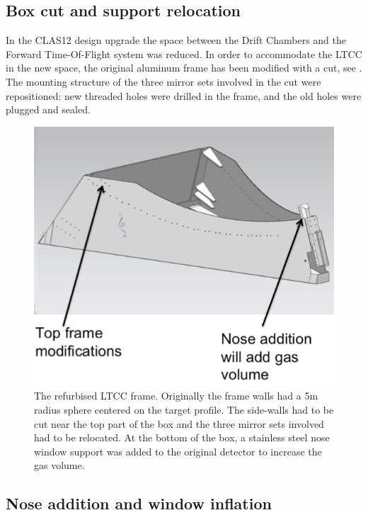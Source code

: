 \subsection{Box cut and support relocation }

In the CLAS12 design upgrade the space between the Drift Chambers and the Forward Time-Of-Flight system was reduced.
In order to accommodate the LTCC in the new space, the original aluminum frame has been modified with a cut, see . The mounting structure
of the three mirror sets involved in the cut were repositioned: new threaded holes were drilled in the frame, and the old holes were plugged and sealed.

\begin{figure}
	\centering
	\includegraphics[width=1.0\columnwidth,keepaspectratio]{img/boxCut.png}
	\caption{The refurbised LTCC frame. Originally the frame walls had a 5m radius sphere centered on the target profile.
            The side-walls had to be cut near the top part of the box and the three mirror sets involved had to be relocated.
				At the bottom of the box, a stainless steel nose window support was added to the original detector to increase the gas volume.}
	\label{fig:boxCut}
\end{figure}


\subsection{Nose addition and window inflation}

